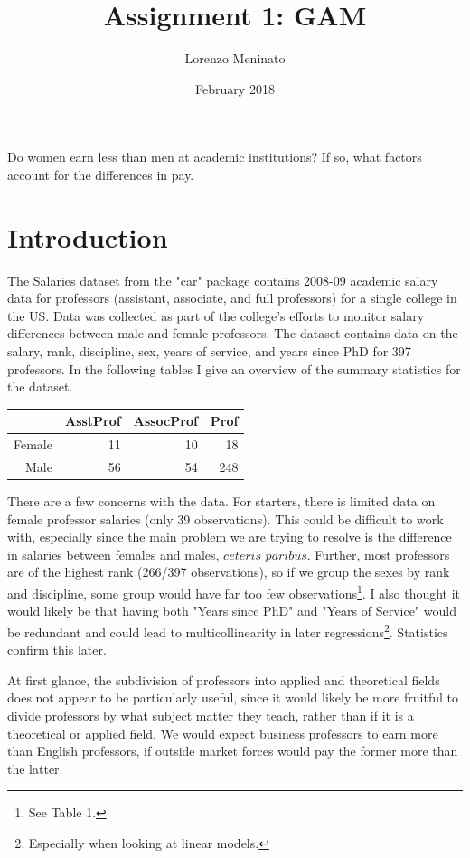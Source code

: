 \documentclass{article}
\title{Assignment 1: GAM}
\author{Lorenzo Meninato}
\date{February 2018}
\begin{document}
\maketitle

Do women earn less than men at academic institutions? If so, what factors account for the differences in pay. 

\section{Introduction}
The Salaries dataset from the "car" package contains 2008-09 academic salary data for professors (assistant, associate, and full professors) for a single college in the US. Data was collected as part of the college's efforts to monitor salary differences between male and female professors. The dataset contains data on the salary, rank, discipline, sex, years of service, and years since PhD for 397 professors. In the following tables I give an overview of the summary statistics for the dataset. 
\begin{table}[ht]
\centering
{} \label{t1} 
\begin{tabular}{rrrr}
  \hline
 & AsstProf & AssocProf & Prof \\ 
  \hline
Female &  11 &  10 &  18 \\ 
  Male &  56 &  54 & 248 \\ 
   \hline
\end{tabular}
\end{table}

There are a few concerns with the data. For starters, there is limited data on female professor salaries (only 39 observations). This could be difficult to work with, especially since the main problem we are trying to resolve is the difference in salaries between females and males, $\textit{ceteris paribus}$. Further, most professors are of the highest rank (266/397 observations), so if we group the sexes by rank and discipline, some group would have far too few observations\footnote{See Table 1.}. I also thought it would likely be that having both "Years since PhD" and "Years of Service" would be redundant and could lead to multicollinearity in later regressions\footnote{Especially when looking at linear models.}. Statistics confirm this later. 


At first glance, the subdivision of professors into applied and theoretical fields does not appear to be particularly useful, since it would likely be more fruitful to divide professors by what subject matter they teach, rather than if it is a theoretical or applied field. We would expect business professors to earn more than English professors, if outside market forces would pay the former more than the latter.
\end{document}
